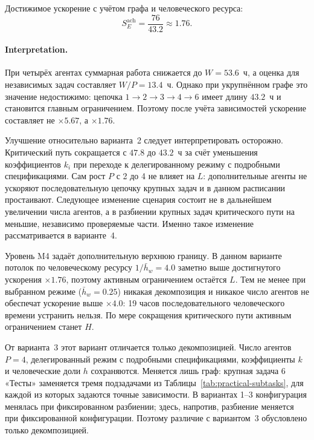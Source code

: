 \documentclass[12pt,a4paper]{article}
\theoremstyle{definition}
\begin{document}
Достижимое ускорение с учётом графа и человеческого ресурса:
\[
  S_E^{\text{ach}} = \frac{76}{43.2} \approx 1.76.
\]

\paragraph{Interpretation.}
При четырёх агентах суммарная работа снижается до $W=53.6$~ч, а оценка для независимых задач составляет $W/P=13.4$~ч. Однако при укрупнённом графе это значение недостижимо: цепочка $1 \to 2 \to 3 \to 4 \to 6$ имеет длину $43.2$~ч и становится главным ограничением. Поэтому после учёта зависимостей ускорение составляет не $\times 5.67$, а $\times 1.76$.

Улучшение относительно варианта~2 следует интерпретировать осторожно. Критический путь сокращается с $47.8$ до $43.2$~ч за счёт уменьшения коэффициентов $k_i$ при переходе к делегированному режиму с подробными спецификациями. Сам рост $P$ с 2 до 4 не влияет на $L$: дополнительные агенты не ускоряют последовательную цепочку крупных задач и в данном расписании простаивают. Следующее изменение сценария состоит не в дальнейшем увеличении числа агентов, а в разбиении крупных задач критического пути на меньшие, независимо проверяемые части. Именно такое изменение рассматривается в варианте~4.

Уровень M4 задаёт дополнительную верхнюю границу. В данном варианте потолок по человеческому ресурсу $1/\bar{h}_w = 4.0$ заметно выше достигнутого ускорения $\times 1.76$, поэтому активным ограничением остаётся $L$. Тем не менее при выбранном режиме ($\bar{h}_w = 0.25$) никакая декомпозиция и никакое число агентов не обеспечат ускорение выше $\times 4.0$: 19 часов последовательного человеческого времени устранить нельзя. По мере сокращения критического пути активным ограничением станет $H$.


От варианта~3 этот вариант отличается только декомпозицией. Число агентов $P = 4$, делегированный режим с подробными спецификациями, коэффициенты $k$ и человеческие доли $h$ сохраняются. Меняется лишь граф: крупная задача 6 «Тесты» заменяется тремя подзадачами из Таблицы~\ref{tab:practical-subtasks}, для каждой из которых задаются точные зависимости. В вариантах 1--3 конфигурация менялась при фиксированном разбиении; здесь, напротив, разбиение меняется при фиксированной конфигурации. Поэтому различие с вариантом~3 обусловлено только декомпозицией.
\end{document}
